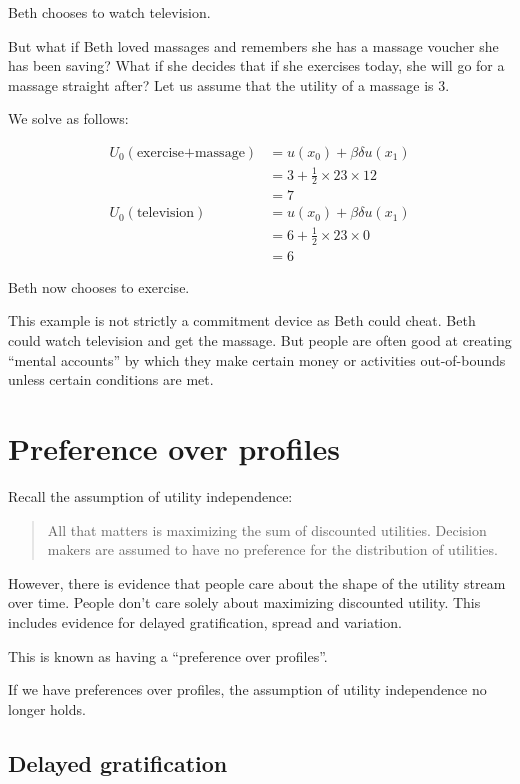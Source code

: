 \documentclass[
  letterpaper,
  DIV=11,
  numbers=noendperiod]{scrreprt}
\begin{document}
Beth chooses to watch television.

But what if Beth loved massages and remembers she has a massage voucher
she has been saving? What if she decides that if she exercises today,
she will go for a massage straight after? Let us assume that the utility
of a massage is 3.

We solve as follows:

\begin{align*}
U_0(\text{exercise+massage})&=u(x_0)+\beta\delta u(x_1) \\
&=3+\frac{1}{2}\times {2}{3}\times 12 \\
&=7
\\
U_0(\text{television})&=u(x_0)+\beta\delta u(x_1) \\
&=6+\frac{1}{2}\times {2}{3}\times 0 \\
&=6
\end{align*}

Beth now chooses to exercise.

This example is not strictly a commitment device as Beth could cheat.
Beth could watch television and get the massage. But people are often
good at creating ``mental accounts'' by which they make certain money or
activities out-of-bounds unless certain conditions are met.

\hypertarget{preference-over-profiles}{%
\chapter{Preference over profiles}\label{preference-over-profiles}}

Recall the assumption of utility independence:

\begin{quote}
All that matters is maximizing the sum of discounted utilities. Decision
makers are assumed to have no preference for the distribution of
utilities.
\end{quote}

However, there is evidence that people care about the shape of the
utility stream over time. People don't care solely about maximizing
discounted utility. This includes evidence for delayed gratification,
spread and variation.

This is known as having a ``preference over profiles''.

If we have preferences over profiles, the assumption of utility
independence no longer holds.

\hypertarget{delayed-gratification}{%
\section{Delayed gratification}\label{delayed-gratification}}
\end{document}
